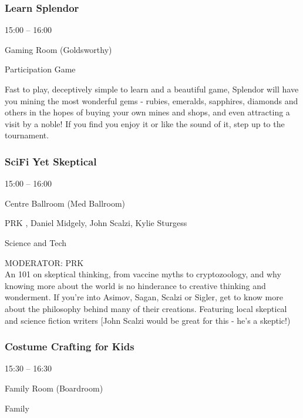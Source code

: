 \documentclass{scrreprt}
\begin{document}
\begin{multicols}{2}
\subsubsection*{Learn Splendor}\begin{description}
\setlength{\itemsep}{0pt}
\setlength{\parsep}{0pt}
\setlength{\parskip}{0pt}
\item[Time:]{15:00 -- 16:00}
\item[Venue:]{Gaming Room (Goldsworthy)}
\item[Tags:]{Participation Game}\end{description}
Fast to play, deceptively simple to learn and a beautiful game, Splendor will have you mining the most wonderful gems - rubies, emeralds, sapphires, diamonds and others in the hopes of buying your own mines and shops, and even attracting a visit by a noble! If you find you enjoy it or like the sound of it, step up to the tournament.
\subsubsection*{SciFi Yet Skeptical}\begin{description}
\setlength{\itemsep}{0pt}
\setlength{\parsep}{0pt}
\setlength{\parskip}{0pt}
\item[Time:]{15:00 -- 16:00}
\item[Venue:]{Centre Ballroom (Med Ballroom)}
\item[People:]{PRK , Daniel Midgely, John Scalzi, Kylie Sturgess}
\item[Tags:]{Science and Tech}\end{description}
MODERATOR: PRK\\An 101 on skeptical thinking, from vaccine myths to cryptozoology, and why knowing more about the world is no hinderance to creative thinking and wonderment. If you're into Asimov, Sagan, Scalzi or Sigler, get to know more about the philosophy behind many of their creations. Featuring local skeptical and science fiction writers [John Scalzi would be great for this - he's a skeptic!)
\subsubsection*{Costume Crafting for Kids}\begin{description}
\setlength{\itemsep}{0pt}
\setlength{\parsep}{0pt}
\setlength{\parskip}{0pt}
\item[Time:]{15:30 -- 16:30}
\item[Venue:]{Family Room (Boardroom)}
\item[Tags:]{Family}\end{description}


\end{multicols}
\end{document}
